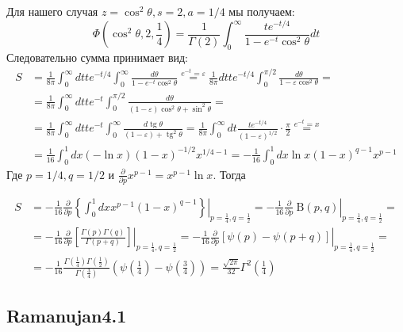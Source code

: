 	Для нашего случая $z=\cos ^2 \theta, s=2, a=1 / 4$ мы получаем:
	$$
	\Phi\left(\cos ^2 \theta, 2, \frac{1}{4}\right)=\frac{1}{\Gamma(2)} \int_0^{\infty} \frac{t e^{-t / 4}}{1-e^{-t} \cos ^2 \theta} d t
	$$
	Следовательно сумма принимает вид:
	$$
	\begin{aligned}
		S & =\frac{1}{8 \pi} \int_0^{\infty} d t t e^{-t / 4} \int_0^{\infty} \frac{d \theta}{1-e^{-t} \cos ^2 \theta} \stackrel{e^{-t}=\varepsilon}{=} \frac{1}{8 \pi} d t t e^{-t / 4} \int_0^{\pi / 2} \frac{d \theta}{1-\varepsilon \cos ^2 \theta}= \\
		& =\frac{1}{8 \pi} \int_0^{\infty} d t t e^{-t} \int_0^{\pi / 2} \frac{d \theta}{(1-\varepsilon) \cos ^2 \theta+\sin ^2 \theta}= \\
		& =\frac{1}{8 \pi} \int_0^{\infty} d t t e^{-t} \int_0^{\infty} \frac{d \operatorname{tg} \theta}{(1-\varepsilon)+\operatorname{tg}^2 \theta}=\frac{1}{8 \pi} \int_0^{\infty} d t \frac{t e^{-t / 4}}{(1-\varepsilon)^{1 / 2}} \cdot \frac{\pi}{2} \stackrel{e^{-t}=x}{=} \\
		& =\frac{1}{16} \int_0^1 d x(-\ln x)(1-x)^{-1 / 2} x^{1 / 4-1}=-\frac{1}{16} \int_0^1 d x \ln x(1-x)^{q-1} x^{p-1}
	\end{aligned}
	$$
	Где $p=1 / 4, q=1 / 2$ и $\frac{\partial}{\partial p} x^{p-1}=x^{p-1} \ln x$. Тогда
	
	$$
	\begin{aligned}
		S & =-\left.\frac{1}{16} \frac{\partial}{\partial p}\left\{\int_0^1 d x x^{p-1}(1-x)^{q-1}\right\}\right|_{p=\frac{1}{4}, q=\frac{1}{2}}=-\left.\frac{1}{16} \frac{\partial}{\partial p} \mathrm{~B}(p, q)\right|_{p=\frac{1}{4}, q=\frac{1}{2}}= \\
		& =-\left.\frac{1}{16} \frac{\partial}{\partial p}\left[\frac{\Gamma(p) \Gamma(q)}{\Gamma(p+q)}\right]\right|_{p=\frac{1}{4}, q=\frac{1}{2}}=-\left.\frac{1}{16} \frac{\partial}{\partial p}[\psi(p)-\psi(p+q)]\right|_{p=\frac{1}{4}, q=\frac{1}{2}}= \\
		& =-\frac{1}{16} \frac{\Gamma\left(\frac{1}{4}\right) \Gamma\left(\frac{1}{2}\right)}{\Gamma\left(\frac{3}{4}\right)}\left(\psi\left(\frac{1}{4}\right)-\psi\left(\frac{3}{4}\right)\right)=\frac{\sqrt{2 \pi}}{32} \Gamma^2\left(\frac{1}{4}\right)
	\end{aligned}
	$$
	
	\subsection{Ramanujan4.1}
	
